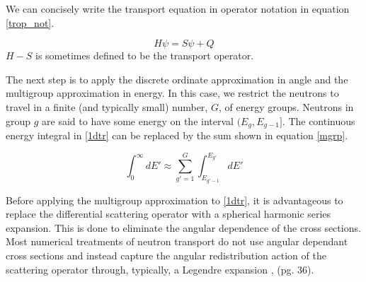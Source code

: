 We can concisely write the transport equation in operator notation in equation \ref{trop_not}.

\begin{equation}
H\psi = S\psi + Q
\label{trop_not}
\end{equation}
$H-S$ is sometimes defined to be the transport operator.

The next step is to apply the discrete ordinate approximation in angle and the multigroup approximation in energy.  In this case, we restrict the neutrons to travel in a finite (and typically small) number, $G$, of energy groups.  Neutrons in group $g$ are said to have some energy on the interval $(E_g, E_{g-1}]$.  The continuous energy integral in \ref{1dtr} can
be replaced by the sum shown in equation \ref{mgrp}.

\begin{equation}
\int_0^\infty dE' \approx \sum_{g'=1}^G \int_{E_{g'-1}}^{E_{g'}} dE'
\label{mgrp}
\end{equation}

Before applying the multigroup approximation to \ref{1dtr}, it is advantageous to replace the differential scattering operator with a spherical harmonic series expansion. This is done to eliminate the angular dependence of the cross sections.  Most numerical treatments of neutron transport do not use angular dependant cross sections and instead capture the angular redistribution action of the scattering operator through, typically, a Legendre expansion \cite{Lewis}, (pg. 36).

